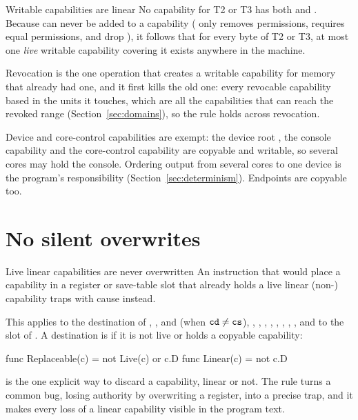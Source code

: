 \begin{rule*}{Writable capabilities are linear}
No capability for T2 or T3 has both  and . Because  can never be added to a
capability ( only removes permissions,  requires equal permissions,
 and  drop ), it follows that for every byte of T2 or T3, at most one
\emph{live} writable capability covering it exists anywhere in the machine.
\end{rule*}

Revocation is the one operation that creates a writable capability for memory that already had one,
and it first kills the old one: every revocable capability based in the units it touches, which are
all the capabilities that can reach the revoked range (Section~\ref{sec:domains}), so the rule holds
across revocation.

Device and core-control capabilities are exempt: the device root , the console capability
 and the core-control capability  are copyable and writable, so several cores may hold
the console. Ordering output from several cores to one device is the program's responsibility
(Section~\ref{sec:determinism}). Endpoints are copyable too.

\section{No silent overwrites}\label{sec:nooverwrite}

\begin{rule*}{Live linear capabilities are never overwritten}
An instruction that would place a capability in a register or save-table slot that already holds a
live linear (non-) capability traps with cause  instead.
\end{rule*}

This applies to the destination of , ,  and 
(when $\texttt{cd} \neq \texttt{cs}$), , , , ,
, , , , and to the slot of . A
destination is  if it is not live or holds a copyable capability:
\begin{pseudo}
func Replaceable(c) = not Live(c) or c.D
func Linear(c)      = not c.D
\end{pseudo}
 is the one explicit way to discard a capability, linear or not. The rule turns a common
bug, losing authority by overwriting a register, into a precise trap, and it makes every loss of a
linear capability visible in the program text.

